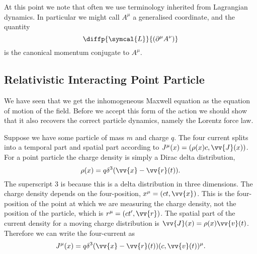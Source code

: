 \documentclass[fleqn]{NotesClass}
\newcommand*{\lagrangianDensity}{\symcal{L}}
\begin{document}
    At this point we note that often we use terminology inherited from Lagrangian dynamics.
    In particular we might call \(A^\mu\) a generalised coordinate, and the quantity
    \begin{equation}
        \diffp{\lagrangianDensity}{(\partial^\mu A^\nu)}
    \end{equation}
    is the canonical momentum conjugate to \(A^\mu\).
    
    \subsection{Relativistic Interacting Point Particle}
    We have seen that we get the inhomogeneous Maxwell equation as the equation of motion of the field.
    Before we accept this form of the action we should show that it also recovers the correct particle dynamics, namely the Lorentz force law.
    
    Suppose we have some particle of mass \(m\) and charge \(q\).
    The four current splits into a temporal part and spatial part according to \(J^\mu(x) = (\rho(x)c, \vv{J}(x))\).
    For a point particle the charge density is simply a Dirac delta distribution,
    \begin{equation}
        \rho(x) = q \delta^3(\vv{x} - \vv{r}(t)).
    \end{equation}
    The superscript 3 is because this is a delta distribution in three dimensions.
    The charge density depends on the four-position, \(x^\mu = (ct, \vv{x})\).
    This is the four-position of the point at which we are measuring the charge density, not the position of the particle, which is \(r^\mu = (ct', \vv{r})\).
    The spatial part of the current density for a moving charge distribution is \(\vv{J}(x) = \rho(x)\vv{v}(t)\).
    Therefore we can write the four-current as
    \begin{equation}
        J^\mu(x) = q\delta^3(\vv{x} - \vv{r}(t))(c, \vv{v}(t))^\mu.
    \end{equation}
    
\end{document}
